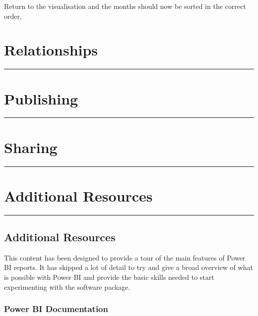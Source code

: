 \documentclass[
]{book}
\begin{document}
Return to the visualisation and the months should now be sorted in the correct order.

\hypertarget{relationships}{%
\chapter{Relationships}\label{relationships}}

\begin{center}\rule{0.5\linewidth}{0.5pt}\end{center}

\hypertarget{publishing}{%
\chapter{Publishing}\label{publishing}}

\begin{center}\rule{0.5\linewidth}{0.5pt}\end{center}

\hypertarget{sharing}{%
\chapter{Sharing}\label{sharing}}

\begin{center}\rule{0.5\linewidth}{0.5pt}\end{center}

\hypertarget{additional-resources}{%
\chapter{Additional Resources}\label{additional-resources}}

\begin{center}\rule{0.5\linewidth}{0.5pt}\end{center}

\hypertarget{additional-resources-1}{%
\section{Additional Resources}\label{additional-resources-1}}

This content has been designed to provide a tour of the main features of Power BI reports. It has skipped a lot of detail to try and give a broad overview of what is possible with Power BI and provide the basic skills needed to start experimenting with the software package.

\hypertarget{power-bi-documentation}{%
\subsection{Power BI Documentation}\label{power-bi-documentation}}
\end{document}
